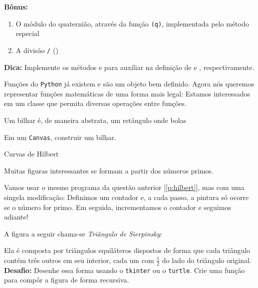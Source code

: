 \documentclass[12pt]{article}
\begin{document}
	\textbf{Bônus:}
	\begin{enumerate}
		\item O módulo do quaternião, através da função \texttt{(q)}, implementada pelo método especial 
		\item A divisão \texttt{\slash} ()
	\end{enumerate}

	\textbf{Dica:} Implemente os métodos  e  para auxiliar na definição de  e , respectivamente.
	
	
	Funções do \texttt{Python} já existem e são um objeto bem definido. Agora nós queremos representar funções matemáticas de uma forma mais legal: Estamos interessados em um classe que permita diversas operações entre funções.
	
	
	
	Um bilhar é, de maneira abstrata, um retângulo onde bolas

	\quest Em um \texttt{Canvas}, construir um bilhar.
	
	
	\label{p:hilbert}
	
	Curvas de Hilbert	
	
	
	Muitas figuras interessantes se formam a partir dos números primos.
	
	\quest Vamos usar o mesmo programa da questão anterior [\ref{p:hilbert}], mas com uma singela modificação: Definimos um contador e, a cada passo, a pintura só ocorre se o número for primo. Em seguida, incrementamos o contador e seguimos adiante!
	
	
	
		
	
	A figura a seguir chama-se \emph{Triângulo de Sierpinsky}:
	

	Ela é composta por triângulos equiláteros dispostos de forma que cada triângulo contém três outros em seu interior, cada um com $\frac{1}{2}$ do lado do triângulo original.\\
	
	\textbf{Desafio:} Desenhe essa forma usando o \texttt{tkinter} ou o \texttt{turtle}. Crie uma função para compôr a figura de forma recursiva.
	
\end{document}
